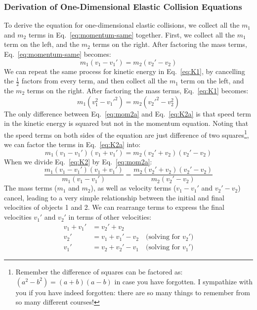 \subsubsection{Derivation of One-Dimensional Elastic Collision Equations}
To derive the equation for one-dimensional elastic collisions, we collect
all the $m_1$ and $m_2$ terms in Eq.~\ref{eq:momentum-same} together. First,
we collect all the $m_1$ term on the left, and the $m_2$ terms on the right.
After factoring the mass terms, Eq.~\ref{eq:momentum-same} becomes:
\begin{equation}
  m_1(v_1-v_1')=m_2(v_2'-v_2)
  \label{eq:mom2a}
\end{equation}
We can repeat the same process for kinetic energy in Eq.~\ref{eq:K1}, by
cancelling the $\frac12$ factors from every term, and then collect all the
$m_1$ term on the left, and the $m_2$ terms on the right. After factoring the
mass terms, Eq.~\ref{eq:K1} becomes:
\begin{equation}
  m_1(v_1^2-v_1'^2) = m_2(v_2'^2-v_2^2)
  \label{eq:K2a}
\end{equation}
The only difference between Eq.~\ref{eq:mom2a} and Eq.~\ref{eq:K2a} is that
speed term in the kinetic energy is squared but not in the momentum equation.
Noting that the speed terms on both sides of the equation are just difference
of two squares\footnote{Remember the difference of squares can be factored as:
$(a^2-b^2)=(a+b)(a-b)$ in case you have forgotten. I sympathize with you if
you have indeed forgotten: there are so many things to remember from so many
different courses!}, we can factor the terms in Eq.~\ref{eq:K2a} into:
\begin{equation}
  m_1(v_1-v_1')(v_1+v_1') = m_2(v_2'+v_2)(v_2'-v_2)
  \label{eq:K2}
\end{equation}
When we divide Eq.~\ref{eq:K2} by Eq.~\ref{eq:mom2a}:
\begin{equation*}
  \frac{m_1(v_1-v_1')(v_1+v_1')}{m_1(v_1-v_1')}
  =
  \frac{m_2(v_2'+v_2)(v_2'-v_2)}{m_2(v_2'-v_2)}
\end{equation*}
The mass terms ($m_1$ and $m_2$), as well as velocity terms ($v_1-v_1'$ and
$v_2'-v_2$) cancel, leading to a very simple relationship between the initial
and final velocities of objects 1 and 2. We can rearrange terms to express
the final velocities $v_1'$ and $v_2'$ in terms of other velocities:
\begin{align}
  \nonumber
  v_1+v_1' &= v_2'+v_2\\
  v_2'&=v_1+v_1'-v_2\quad\text{(solving for $v_2'$)}\label{eq:relvel1}\\
  v_1'&=v_2+v_2'-v_1\quad\text{(solving for $v_1'$)}\label{eq:relvel}
\end{align}
